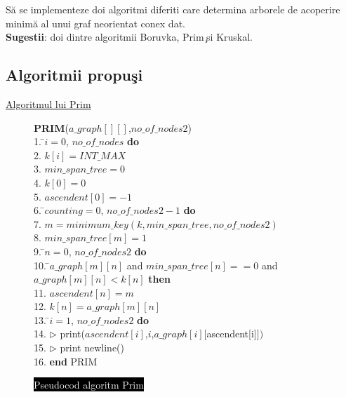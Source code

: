 \documentclass[14pt]{article}
\begin{document}
S\u{a} se implementeze doi algoritmi diferiti care
determina arborele de acoperire minim\u{a} al unui graf neorientat conex dat.\\
\textbf{Sugestii}: doi dintre algoritmii Boruvka, Prim  ̧si Kruskal.

\vspace{2 mm}

\subsection{Algoritmii propu\c si}
\vspace{5mm}

\large{\underline{Algoritmul lui Prim}}
\vspace{4mm}

\begin{figure}[h]
\begin{center}
\begin{tabbing}
\textbf{PRIM}($a\_graph[ ][ ]$,$no\_of\_nodes2$)\\
1.  \=$i = 0$, $no\_of\_nodes$ {\bf do} \\
2. \indent            \> $k[i] = INT\_MAX$ \\
3. \indent            \> $min\_span\_tree = 0$ \\
4. $k[0] = 0$ \\
5. $ascendent[0] = -1$ \\
6.  \=$counting = 0$, $no\_of\_nodes2 - 1$ {\bf do} \\
7. \indent            \> $m = minimum\_key (k, min\_span\_tree, no\_of\_nodes2)$\\
8. \indent            \> $min\_span\_tree[m] = 1$ \\
9.  \=$n = 0$, $no\_of\_nodes2$ {\bf do} \\
10.\indent            {} \=$a\_graph[m][n]$  and  $min\_span\_tree[n]  ==  0$  and $a\_graph[m][n] < k[n]$ {\bf then} \\
11. \indent           \>           \> $ascendent[n]=m$ \\
12. \indent           \>           \> $k[n] = a\_graph[m][n]$\\
13.  \=$i = 1$, $no\_of\_nodes2$ {\bf do} \\
14. \indent            \> $\rhd$ print($ascendent[i]$,$i$,$a\_graph[i][$ascendent[i]$])$ \\
15.\indent             \> $\rhd$ print newline()\\
16.  \textbf{end} PRIM
\vspace{2mm}

\end{tabbing}
\caption{\colorbox{black}{\textcolor{white}{Pseudocod algoritm Prim}}}
\end{center}
\end{figure}
\end{document}
